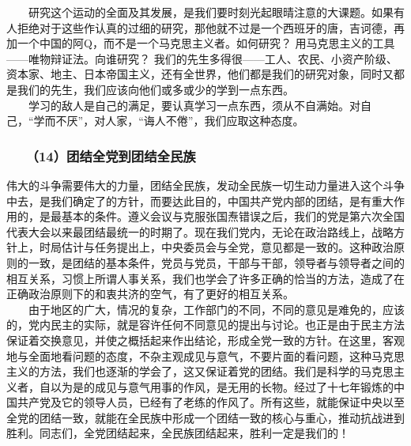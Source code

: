 \documentclass[cn,11pt,chinese]{elegantbook}
\def\myformat#1{\hfil\hfil #1}
\begin{document}
　　研究这个运动的全面及其发展，是我们要时刻光起眼晴注意的大课题。如果有人拒绝对于这些作认真的过细的研究，那他就不过是一个西班牙的唐，吉诃德，再加一个中国的阿Q，而不是一个马克思主义者。如何研究？  用马克思主义的工具——唯物辩证法。向谁研究？  我们的先生多得很——工人、农民、小资产阶级、资本家、地主、日本帝国主义，还有全世界，他们都是我们的研究对象，同时又都是我们的先生，我们应该向他们或多或少的学到一点东西。\\
　　学习的敌人是自己的满足，要认真学习一点东西，须从不自满始。对自己，“学而不厌”，对人家，“诲人不倦”，我们应取这种态度。\\
\subsubsection*{\myformat{　　（14）团结全党到团结全民族}}
伟大的斗争需要伟大的力量，团结全民族，发动全民族一切生动力量进入这个斗争中去，是我们确定了的方针，而要达此目的，中国共产党内部的团结，是有重大作用的，是最基本的条件。遵义会议与克服张国焘错误之后，我们的党是第六次全国代表大会以来最团结最统一的时期了。现在我们党内，无论在政治路线上，战略方针上，时局估计与任务提出上，中央委员会与全党，意见都是一致的。这种政治原则的一致，是团结的基本条件，党员与党员，干部与干部，领导者与领导者之间的相互关系，习惯上所谓人事关系，我们也学会了许多正确的恰当的方法，造成了在正确政治原则下的和衷共济的空气，有了更好的相互关系。\\
　　由于地区的广大，情况的复杂，工作部门的不同，不同的意见是难免的，应该的，党内民主的实际，就是容许任何不同意见的提出与讨论。也正是由于民主方法保证着交换意见，并使之概括起来作出结论，形成全党一致的方针。在这里，客观地与全面地看问题的态度，不杂主观成见与意气，不要片面的看问题，这种马克思主义的方法，我们也逐渐的学会了，这又保证着党的团结。我们是科学的马克思主义者，自以为是的成见与意气用事的作风，是无用的长物。经过了十七年锻炼的中国共产党及它的领导人员，已经有了老练的作风了。所有这些，就能保证中央以至全党的团结一致，就能在全民族中形成一个团结一致的核心与重心，推动抗战进到胜利。同志们，全党团结起来，全民族团结起来，胜利一定是我们的！\\
\end{document}
